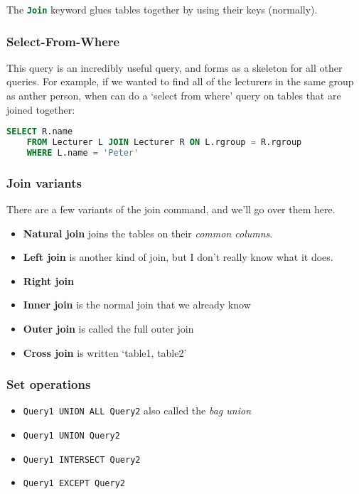 \documentclass[11pt,a4paper,titlepage,dvipsnames,cmyk]{scrartcl}
\begin{document}
The \lstinline[language=SQL]|Join| keyword glues tables together by using
their keys (normally).

\subsubsection{Select-From-Where}%
\label{ssub:Select-From-Where}
This query is an incredibly useful query, and forms as a skeleton for all
other queries. For example, if we wanted to find all of the lecturers in
the same group as anther person, when can do a `select from where' query
on tables that are joined together:

\begin{lstlisting}[language=SQL]
SELECT R.name
    FROM Lecturer L JOIN Lecturer R ON L.rgroup = R.rgroup
    WHERE L.name = 'Peter'
\end{lstlisting}

\subsubsection{Join variants}%
\label{ssub:variants-join}

There are a few variants of the join command, and we'll go over them here.

\begin{itemize}
    \item \textbf{Natural join} joins the tables on their \textit{common
        columns}.
    \item \textbf{Left join} is another kind of join, but I don't really
        know what it does.
    \item \textbf{Right join}
    \item \textbf{Inner join} is the normal join that we already know
    \item \textbf{Outer join} is called the full outer join
    \item \textbf{Cross join} is written `table1, table2'
\end{itemize}

\subsubsection{Set operations}%
\label{ssub:set-operations}
\begin{itemize}
    \item \lstinline|Query1 UNION ALL Query2| also called the \textit{bag
        union} 
    \item \lstinline|Query1 UNION Query2| 
    \item \lstinline|Query1 INTERSECT Query2| 
    \item \lstinline|Query1 EXCEPT Query2| 
\end{itemize}
\end{document}
